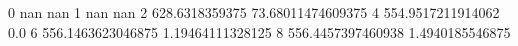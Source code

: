0 nan nan
1 nan nan
2 628.6318359375 73.68011474609375
4 554.9517211914062 0.0
6 556.1463623046875 1.19464111328125
8 556.4457397460938 1.4940185546875
